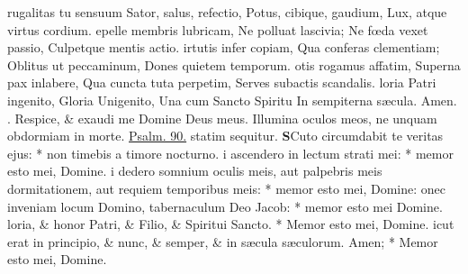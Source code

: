 \documentclass[letter,11pt]{book}
\makeatletter
\DeclareRobustCommand{\Vbar}{\vers@resp{-0.1em}{V}}
\newcommand{\vers@resp@sym}{\raisebox{0.2ex}{\rotatebox[origin=c]{-20}{$\m@th\rceil$}}}
\newcommand{\vers@resp}[2]{%
  {\ooalign{\hidewidth\kern#1\vers@resp@sym\hidewidth\cr#2\cr}}%
}%
\def\V{\color{Red} \Vbar . \color{black}}
\makeatother
\begin{document}
\begin{multicols*}{2}
rugalitas tu sensuum
\newline \indent Sator, salus, refectio,
\newline \indent Potus, cibique, gaudium,
\newline \indent Lux, atque virtus cordium.
epelle membris lubricam,
\newline \indent Ne polluat lascivia;
\newline \indent Ne f\oe da vexet passio,
\newline \indent Culpetque mentis actio.
irtutis infer copiam,
\newline \indent Qua conferas clementiam;
\newline \indent Oblitus ut peccaminum,
\newline \indent Dones quietem temporum.
otis rogamus affatim,
\newline \indent Superna pax inlabere,
\newline \indent Qua cuncta tuta perpetim,
\newline \indent Serves subactis scandalis.
loria Patri ingenito,
\newline \indent Gloria Unigenito,
\newline \indent Una cum Sancto Spiritu
\newline \indent In sempiterna s\ae cula. Amen.
\newline \V Respice, \& exaudi me Domine Deus meus. Illumina oculos meos, ne unquam obdormiam in morte. \color{Red} \hyperlink{ps90}{Psalm. 90.} statim sequitur. \color{black}
\lettrine[lines=2]{\bfseries \color{Red} S}{}Cuto circumdabit te veritas ejus: * non timebis a timore nocturno.
i ascendero in lectum strati mei: * memor esto mei, Domine.
i dedero somnium oculis meis, aut palpebris meis dormitationem, aut requiem temporibus meis: * memor esto mei, Domine:
onec inveniam locum Domino, tabernaculum Deo Jacob: * memor esto mei Domine.
loria, \& honor Patri, \& Filio, \& Spiritui Sancto. * Memor esto mei, Domine.
icut erat in principio, \& nunc, \& semper, \& in s\ae cula s\ae culorum. Amen; * Memor esto mei, Domine.

\end{multicols*}
\end{document}
